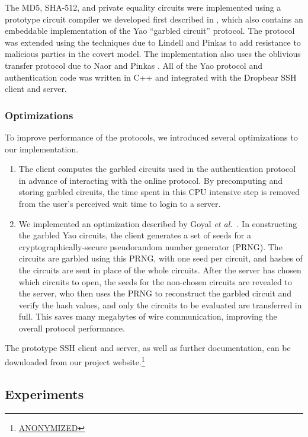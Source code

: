 The MD5, SHA-512, and private equality circuits were implemented using a
prototype circuit compiler we developed first described in
\cite{1398071}, which also contains an embeddable implementation of
the Yao {}``garbled circuit'' protocol. The protocol was extended
using the techniques due to Lindell and Pinkas
\cite{lindellpinkas-eurocrypt07} to add resistance to malicious
parties in the covert model. The implementation also uses the
oblivious transfer protocol due to Naor and Pinkas
\cite{Naor-Pinkas:2001}.  All of the Yao protocol and authentication
code was written in C++ and integrated with the Dropbear SSH
client and server.

\subsubsection{Optimizations}

To improve performance of the protocols, we introduced several
optimizations to our implementation.
\begin{enumerate}
\item The client computes the garbled circuits used in the
authentication protocol in advance of interacting with the online
protocol.  By precomputing and storing garbled circuits, the time
spent in this CPU intensive step is removed from the user's perceived
wait time to login to a server.
\item We implemented an optimization described by 
Goyal \textit{et al.}~\cite{goyalmohasselsmith-eurocrypt08}.  In
constructing the garbled Yao circuits, the client generates a set of
seeds for a cryptographically-secure pseudorandom number generator (PRNG).
The circuits are garbled using this PRNG, with one seed per circuit,
and hashes of the circuits are sent in place of the whole circuits.
After the server has chosen which circuits to open, the seeds for
the non-chosen circuits are revealed to the server, who then uses the
PRNG to reconstruct the garbled circuit and verify the hash values,
and only the circuits to be evaluated are transferred in full.  This
saves many megabytes of wire communication, improving the overall
protocol performance.
\end{enumerate}

The prototype SSH client and server, as well as further documentation,
can be downloaded from our project 
website.\footnote{\url{ANONYMIZED}}


\subsection{Experiments}


